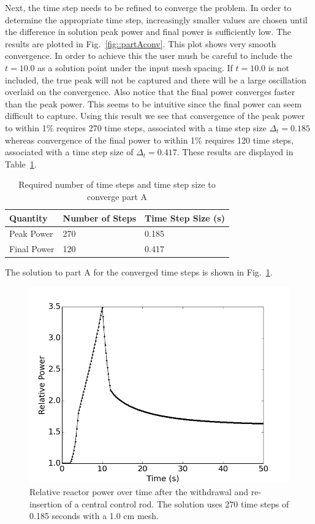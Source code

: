 \documentclass[12pt]{report}
\begin{document}
	Next, the time step needs to be refined to converge the problem. In order to determine the appropriate time step, increasingly smaller values are chosen until the difference in solution peak power and final power is sufficiently low. The results are plotted in Fig.~\ref{fig::partAconv}. This plot shows very smooth convergence. In order to achieve this the user mush be careful to include the $t=10.0$ as a solution point under the input mesh spacing. If $t=10.0$ is not included, the true peak will not be captured and there will be a large oscillation overlaid on the convergence. Also notice that the final power converges faster than the peak power. This seems to be intuitive since the final power can seem difficult to capture. Using this result we see that convergence of the peak power to within 1\% requires 270 time steps, associated with a time step size $\Delta_t = 0.185$ whereas convergence of the final power to within 1\% requires 120 time steps, associated with a time step size of $\Delta_t = 0.417$. These results are displayed in Table~\ref{tab::timestepA}.
	
		\begin{table}[ht]
			\begin{center}
				\caption{\label{tab::timestepA} Required number of time steps and time step size to converge part A}
				\begin{tabular}{lll}
					\hline
					Quantity & Number of Steps & Time Step Size (s) \\
					\hline
					Peak Power & 270 & 0.185\\
					Final Power & 120 & 0.417\\
					\hline
				\end{tabular}
			\end{center}
		\end{table}
	
	\clearpage
	The solution to part A for the converged time steps is shown in Fig.~\ref{fig::partA_power}.
	\begin{figure}[ht]
		\centering
		\includegraphics[width=.9\linewidth]{figs/partA_trans271.png}
		\caption{Relative reactor power over time after the withdrawal and re-insertion of a central control rod. The solution uses 270 time steps of 0.185 seconds with a 1.0 cm mesh.}
		\label{fig::partA_power}
	\end{figure}
	
\end{document}
